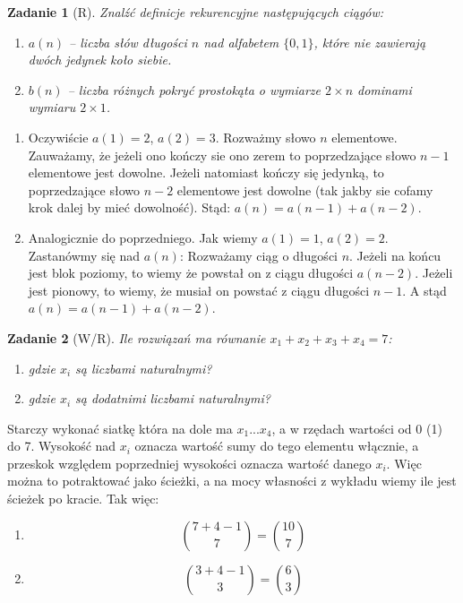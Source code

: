\documentclass{mwbk}
\newtheorem{zad}{Zadanie}[chapter]
\begin{document}
\begin{zad}[R]
    Znalźć definicje rekurencyjne następujących ciągów:
    \begin{enumerate}
        \item $a(n)$ -- liczba słów długości $n$ nad alfabetem
              $\{0, 1\}$, które nie zawierają dwóch jedynek koło siebie.
        \item  $b(n)$ -- liczba różnych pokryć prostokąta o wymiarze
              $2 \times n$ dominami wymiaru $2 \times 1$.
    \end{enumerate}
\end{zad}
\begin{mdframed}
    \begin{enumerate}
        \item Oczywiście $a(1)=2$, $a(2)=3$.  Rozważmy słowo $n$ elementowe.
              Zauważamy, że jeżeli ono kończy sie ono zerem to poprzedzające słowo $n-1$
              elementowe jest dowolne. Jeżeli natomiast kończy się jedynką,
              to poprzedzające słowo $n-2$ elementowe jest dowolne
              (tak jakby sie cofamy krok dalej by mieć dowolność).
              Stąd: $a(n)=a(n-1)+a(n-2)$.
        \item Analogicznie do poprzedniego. Jak wiemy $a(1) = 1$, $a(2) = 2$. Zastanówmy się nad $a(n)$:
              Rozważamy ciąg o długości $n$. Jeżeli na końcu jest blok poziomy,
              to wiemy że powstał on z ciągu długości $a(n-2)$.
              Jeżeli jest pionowy, to wiemy, że musiał on powstać z ciągu długości $n-1$.
              A stąd $a(n) = a(n-1) + a(n-2)$.
    \end{enumerate}
\end{mdframed}




\begin{zad}[W/R]
    Ile rozwiązań ma równanie $x_1 + x_2+x_3+x_4 = 7$:
    \begin{enumerate}
        \item gdzie $x_i$ są liczbami naturalnymi?
        \item gdzie $x_i$ są dodatnimi liczbami naturalnymi?
    \end{enumerate}
\end{zad}
\begin{mdframed}
    Starczy wykonać siatkę która na dole ma $x_1 ... x_4$, a w rzędach
    wartości od 0 (1) do 7. Wysokość nad $x_i$ oznacza wartość sumy do
    tego elementu włącznie, a przeskok względem poprzedniej wysokości
    oznacza wartość danego $x_i$. Więc można to potraktować jako ścieżki,
    a na mocy własności z wykładu wiemy ile jest ścieżek po kracie. Tak więc:
    \begin{enumerate}
        \item \[\binom{7+4-1}{7}=\binom{10}{7}\]
        \item \[\binom{3+4-1}{3}=\binom{6}{3}\]
    \end{enumerate}
\end{mdframed}
\end{document}
